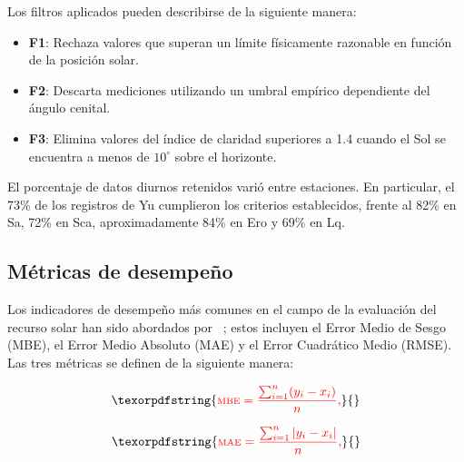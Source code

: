 \documentclass[letterpaper,12pt, twoside]{report}
\providecommand{\DIFdeltex}[1]{{\protect\color{red} \scriptsize #1}} %
\providecommand{\DIFdel}[1]{\texorpdfstring{\DIFdeltex{#1}}{}} %
\begin{document}
\DIFdel{Los filtros aplicados pueden describirse de la siguiente manera:
}%

\begin{itemize}%
\item%
\DIFdel{\textbf{F1}: Rechaza valores que superan un límite físicamente razonable en función de la posición solar.
    }%
\item%
\DIFdel{\textbf{F2}: Descarta mediciones utilizando un umbral empírico dependiente del ángulo cenital.
    }%
\item%
\DIFdel{\textbf{F3}: Elimina valores del índice de claridad superiores a 1.4 cuando el Sol se encuentra a menos de $10^\circ$ sobre el horizonte.
}
\end{itemize}%

\DIFdel{El porcentaje de datos diurnos retenidos varió entre estaciones. En particular, el 73\% de los registros de Yu cumplieron los criterios establecidos, frente al 82\% en Sa, 72\% en Sca, aproximadamente 84\% en Ero y 69\% en Lq.
}%

\subsection{\DIFdel{Métricas de desempeño}}
\addtocounter{subsection}{-1}%

\DIFdel{Los indicadores de desempeño más comunes en el campo de la evaluación del recurso solar han sido abordados por ~\cite{ZHANG}; estos incluyen el Error Medio de Sesgo (MBE), el Error Medio Absoluto (MAE) y el Error Cuadrático Medio (RMSE). Las tres métricas se definen de la siguiente manera:
}%

\begin{displaymath}
\DIFdel{\text{MBE} = \frac{\sum_{i=1}^{n} ( {y_i} - {x_i} ) }{n},
}\end{displaymath}%

\begin{displaymath}
\DIFdel{\text{MAE} = \frac{\sum_{i=1}^{n} |{y_i} - {x_i} | }{n},
}\end{displaymath}%
\end{document}
